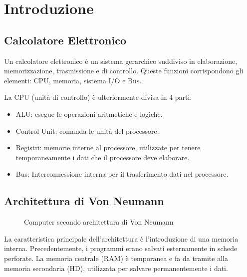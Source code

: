 \documentclass[../ace.tex]{subfiles}
\begin{document}
\section{Introduzione}
\subsection{Calcolatore Elettronico}
Un calcolatore elettronico è un sistema gerarchico suddiviso in elaborazione,
memorizzazione, trasmissione e di controllo.  Queste funzioni corrispondono
gli elementi: CPU, memoria, sistema I/O e Bus.

La CPU (unità di controllo) è ulteriormente divisa in 4 parti:
\begin{itemize}
    \item ALU: esegue le operazioni aritmetiche e logiche.
    \item Control Unit: comanda le unità del processore.
    \item Registri: memorie interne al processore, utilizzate per tenere temporaneamente i
        dati che il processore deve elaborare.
    \item Bus: Interconnessione interna per il trasferimento dati nel processore.
\end{itemize}

\subsection{Architettura di Von Neumann}
\begin{figure}[h]
    \centering

    \caption{Computer secondo architettura di Von Neumann}
    \label{img:von_neumann}
\end{figure}
\noindent
La caratteristica principale dell'architettura è l'introduzione di una memoria interna.
Precedentemente, i programmi erano salvati esternamente in schede perforate.
La memoria centrale (RAM) è temporanea e fa da tramite alla memoria secondaria (HD), utilizzata per salvare
permanentemente i dati.
\end{document}
